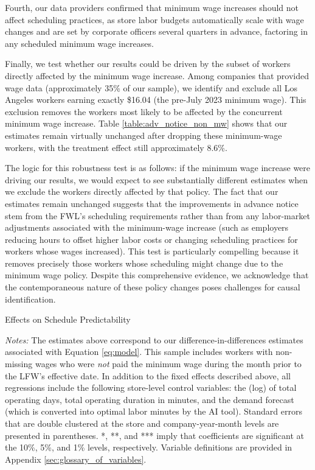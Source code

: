 \documentclass[letterpaper,11pt,leqno]{article}
\theoremstyle{paper}
\newcommand{\note}[2][]{\parbox{\textwidth}{\footnotesize\vspace*{10pt}\textit{#1}#2}}
\begin{document}
Fourth, our data providers confirmed that minimum wage increases should not affect scheduling practices, as store labor budgets automatically scale with wage changes and are set by corporate officers several quarters in advance, factoring in any scheduled minimum wage increases.

Finally, we test whether our results could be driven by the subset of workers directly affected by the minimum wage increase. Among companies that provided wage data (approximately 35\% of our sample), we identify and exclude all Los Angeles workers earning exactly \$16.04 (the pre-July 2023 minimum wage). This exclusion removes the workers most likely to be affected by the concurrent minimum wage increase. Table \ref{table:adv_notice_non_mw} shows that our estimates remain virtually unchanged after dropping these minimum-wage workers, with the treatment effect still approximately 8.6\%. 

The logic for this robustness test is as follows: if the minimum wage increase were driving our results, we would expect to see substantially different estimates when we exclude the workers directly affected by that policy. The fact that our estimates remain unchanged suggests that the improvements in advance notice stem from the FWL's scheduling requirements rather than from any labor-market adjustments associated with the minimum-wage increase (such as employers reducing hours to offset higher labor costs or changing scheduling practices for workers whose wages increased). This test is particularly compelling because it removes precisely those workers whose scheduling might change due to the minimum wage policy. Despite this comprehensive evidence, we acknowledge that the contemporaneous nature of these policy changes poses challenges for causal identification.

\begin{singlespace}
\begin{table}[h]
\caption{Effects on Schedule Predictability}

\note{ \scriptsize \textit{Notes: } The estimates above correspond to our difference-in-differences estimates associated with Equation \ref{eq:model}. This sample includes workers with non-missing wages who were \textit{not} paid the minimum wage during the month prior to the LFW's effective date. In addition to the fixed effects described above, all regressions include the following store-level control variables: the (log) of total operating days, total operating duration in minutes, and the demand forecast (which is converted into optimal labor minutes by the AI tool). Standard errors that are double clustered at the store and company-year-month levels are presented in parentheses. *, **, and *** imply that coefficients are significant at the 10\%, 5\%, and 1\% levels, respectively. Variable definitions are provided in Appendix \ref{sec:glossary_of_variables}.}
\label{table:adv_notice_non_mw}
\end{table}
\end{singlespace}
\end{document}

